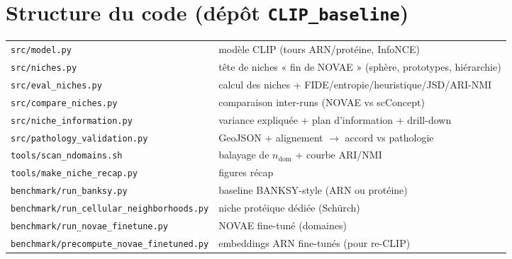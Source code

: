 \documentclass[11pt,a4paper]{article}
\begin{document}
\appendix
\section{Structure du code (dépôt \texttt{CLIP\_baseline})}
\small
\begin{tabular}{ll}
\toprule
\texttt{src/model.py} & modèle CLIP (tours ARN/protéine, InfoNCE) \\
\texttt{src/niches.py} & tête de niches « fin de NOVAE » (sphère, prototypes, hiérarchie) \\
\texttt{src/eval\_niches.py} & calcul des niches + FIDE/entropie/heuristique/JSD/ARI-NMI \\
\texttt{src/compare\_niches.py} & comparaison inter-runs (NOVAE vs scConcept) \\
\texttt{src/niche\_information.py} & variance expliquée + plan d'information + drill-down \\
\texttt{src/pathology\_validation.py} & GeoJSON + alignement $\rightarrow$ accord vs pathologie \\
\texttt{tools/scan\_ndomains.sh} & balayage de $n_{\text{dom}}$ + courbe ARI/NMI \\
\texttt{tools/make\_niche\_recap.py} & figures récap \\
\texttt{benchmark/run\_banksy.py} & baseline BANKSY-style (ARN ou protéine) \\
\texttt{benchmark/run\_cellular\_neighborhoods.py} & niche protéique dédiée (Schürch) \\
\texttt{benchmark/run\_novae\_finetune.py} & NOVAE fine-tuné (domaines) \\
\texttt{benchmark/precompute\_novae\_finetuned.py} & embeddings ARN fine-tunés (pour re-CLIP) \\
\bottomrule
\end{tabular}
\end{document}
